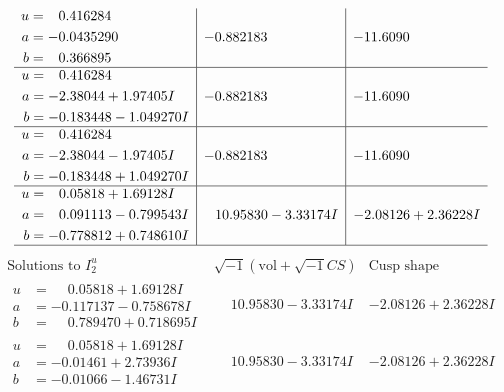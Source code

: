 \documentclass[1p]{elsarticle_modified}
\theoremstyle{definition}
\newcommand{\I}{\sqrt{-1}}
\begin{document}
$$\begin{array}{c|c|c}
\begin{aligned}
u &= \phantom{-}0.416284\phantom{ +0.000000I} \\
a &= -0.0435290\phantom{ +0.000000I} \\
b &= \phantom{-}0.366895\phantom{ +0.000000I}\end{aligned}
 & -0.882183\phantom{ +0.000000I} & -11.6090\phantom{ +0.000000I} \\ \hline\begin{aligned}
u &= \phantom{-}0.416284\phantom{ +0.000000I} \\
a &= -2.38044 + 1.97405 I \\
b &= -0.183448 - 1.049270 I\end{aligned}
 & -0.882183\phantom{ +0.000000I} & -11.6090\phantom{ +0.000000I} \\ \hline\begin{aligned}
u &= \phantom{-}0.416284\phantom{ +0.000000I} \\
a &= -2.38044 - 1.97405 I \\
b &= -0.183448 + 1.049270 I\end{aligned}
 & -0.882183\phantom{ +0.000000I} & -11.6090\phantom{ +0.000000I} \\ \hline\begin{aligned}
u &= \phantom{-}0.05818 + 1.69128 I \\
a &= \phantom{-}0.091113 - 0.799543 I \\
b &= -0.778812 + 0.748610 I\end{aligned}
 & \phantom{-}10.95830 - 3.33174 I & -2.08126 + 2.36228 I\\
 \hline 
 \end{array}$$\newpage$$\begin{array}{c|c|c}  
\text{Solutions to }I^u_{2}& \I (\text{vol} + \sqrt{-1}CS) & \text{Cusp shape}\\
 \hline 
\begin{aligned}
u &= \phantom{-}0.05818 + 1.69128 I \\
a &= -0.117137 - 0.758678 I \\
b &= \phantom{-}0.789470 + 0.718695 I\end{aligned}
 & \phantom{-}10.95830 - 3.33174 I & -2.08126 + 2.36228 I \\ \hline\begin{aligned}
u &= \phantom{-}0.05818 + 1.69128 I \\
a &= -0.01461 + 2.73936 I \\
b &= -0.01066 - 1.46731 I\end{aligned}
 & \phantom{-}10.95830 - 3.33174 I & -2.08126 + 2.36228 I \\ \hline\begin{aligned}

\end{aligned}
\end{array}$$
\end{document}
